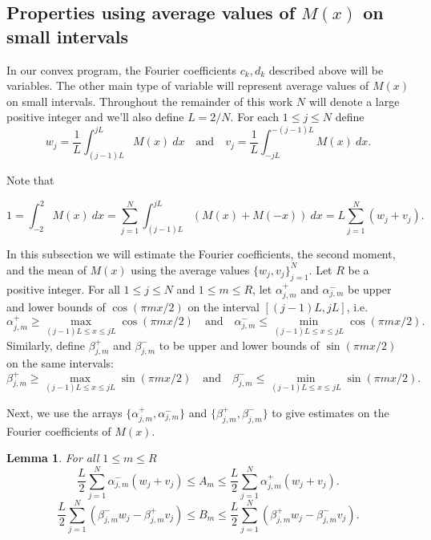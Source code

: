 \documentclass[12pt]{article}
\newtheorem{lemma}[theorem]{Lemma}
\numberwithin{equation}{section}
\begin{document}
\subsection{Properties using average values of $M(x)$ on small intervals }


In our convex program, the Fourier coefficients $c_k,d_k$ described above will be variables. The other main type of variable will represent average values of $M(x)$ on small intervals. Throughout the remainder of this work $N$ will denote a large positive integer and we'll also define $L = 2/N$. For each $1 \leq j \leq N$ define 
\[ w_j = \frac{1}{L} \int_{(j-1)L}^{jL} M(x) \ dx\quad \text{and} \quad v_j = \frac{1}{L} \int_{-jL}^{-(j-1)L} M(x) \ dx.\]

Note that 

\begin{equation}\label{mmass} 1=  \int_{-2}^2 M(x) \ dx = \sum_{j=1}^N \int_{(j-1)L}^{jL} (M(x)+M(-x)) \ dx = L\sum_{j=1}^N (w_j+v_j).\end{equation}


In this subsection we will estimate the Fourier coefficients, the second moment, and the mean of $M(x)$ using the average values $\{w_j,v_j\}_{j=1}^N$. Let $R$ be a positive integer. For all $1 \leq j \leq N$ and $1 \leq m \leq R$, let $\alpha^+_{j,m}$ and $\alpha^-_{j,m}$ be upper and lower bounds of $\cos (\pi m x/2)$ on the interval $[(j-1)L,jL]$, i.e.
\begin{equation}\label{alphaarray} \alpha_{j,m}^+ \geq \max_{(j-1)L \leq x \leq jL} \cos (\pi m x/2) \quad \text{and}\quad \alpha_{j,m}^- \leq \min_{(j-1)L \leq x \leq jL} \cos (\pi m x/2).\end{equation}
Similarly, define $\beta^+_{j,m}$ and $\beta^-_{j,m}$ to be upper and lower bounds of $\sin (\pi m x/2)$ on the same intervals:
\begin{equation}\label{betaarray} \beta_{j,m}^+ \geq \max_{(j-1)L \leq x \leq jL} \sin (\pi m x/2) \quad \text{and}\quad \beta_{j,m}^- \leq \min_{(j-1)L \leq x \leq jL} \sin (\pi m x/2).\end{equation}

Next, we use the arrays $\{\alpha^+_{j,m},\alpha^-_{j,m}\}$ and $\{\beta^+_{j,m},\beta^-_{j,m}\}$ to give estimates on the Fourier coefficients of $M(x)$.

\begin{lemma}\label{trigintervallem} For all $1 \leq m \leq R$
\[\frac{L}{2}  \sum_{j=1}^N \alpha_{j,m}^-(w_j+v_j)  \leq A_m \leq \frac{L}{2} \sum_{j=1}^N \alpha_{j,m}^+(w_j+v_j). \]
\[ \frac{L}{2} \sum_{j=1}^N (\beta_{j,m}^-w_j-\beta_{j,m}^+v_j) \leq B_m \leq \frac{L}{2} \sum_{j=1}^N (\beta_{j,m}^+w_j-\beta_{j,m}^-v_j). \]
\end{lemma} 
\end{document}
